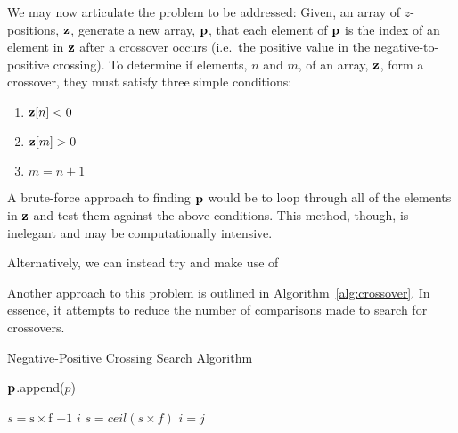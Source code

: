 We may now articulate the problem to be addressed: Given, an array of
$z$-positions, $\bm{\mathrm{z}}$, generate a new array, $\bm{\mathrm{p}}$, that each element of
$\bm{\mathrm{p}}$ is the index of an element in $\bm{\mathrm{z}}$ after a crossover occurs (i.e.\
the positive value in the negative-to-positive crossing). To determine if
elements, $n$ and $m$, of an array, $\bm{\mathrm{z}}$, form a crossover, they must
satisfy three simple conditions:

\begin{enumerate}
    \item $\bm{\mathrm{z}}[n] < 0$
    \item $\bm{\mathrm{z}}[m] > 0$ 
    \item $m = n+1$
\end{enumerate}


A brute-force approach to finding $\bm{\mathrm{p}}$ would be to loop through all of the
elements in $\bm{\mathrm{z}}$ and test them against the above conditions. This method,
though, is inelegant and may be computationally intensive.  

Alternatively, we can instead try and make use of 

Another approach to
this problem is outlined in Algorithm~\ref{alg:crossover}.  In essence, it
attempts to reduce the number of comparisons made to search for crossovers. 

\begin{algorithm}[h] 
    \caption{Negative-Positive Crossing Search Algorithm} 
    \label{alg:crossover}
    \begin{algorithmic}[1] 

	     
	    \Let{$\bm{\mathrm{p}}$}{$\{ p \}$}

		 \State
		$$.append($p$) \EndWhile 
		\State \Return \se{p}
	\EndFunction

	\State

	    \State $s = \mathrm{s \times f}$  
	    \State \Return $-1$	  
	    \State \Return $i$ 
	    \Else
		\State $s = ceil(s \times f)$
	    \EndIf
	\Else
	    \State $i=j$
	\EndIf
	\State \Return {}
	\EndFunction 
    \end{algorithmic} 
\end{algorithm}


